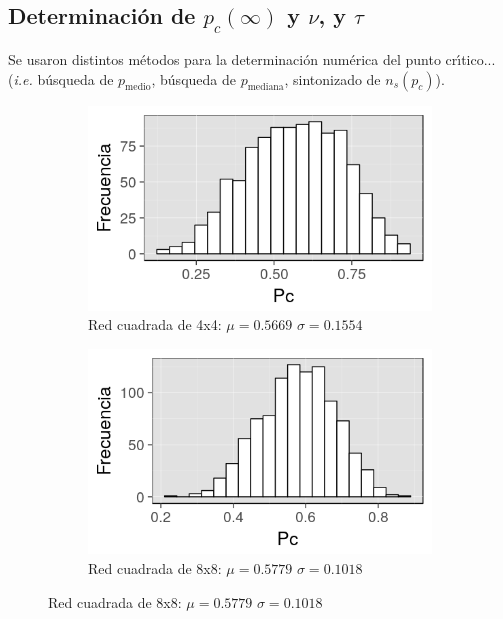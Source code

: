 \documentclass[%
 reprint,
 amsmath,amssymb,
 aps,
spanish]{revtex4-1}
\begin{document}
\subsection{\label{p_c} Determinaci\'on de $p_c(\infty)$ y $\nu$, y $\tau$}

Se usaron distintos m\'etodos para la determinaci\'on num\'erica del punto cr\'\i tico...(\emph{i.e.} b\'usqueda de $p_\mathrm{medio}$, b\'usqueda de $p_\mathrm{mediana}$, sintonizado de $n_s(p_c)$).

\begin{figure}[h]
\begin{subfigure}{.25\textwidth}
  \centering
  \includegraphics[width=.9\linewidth]{ej1a/hist4x4}
  \caption{Red cuadrada de 4x4: $\mu=0.5669$ $\sigma=0.1554$}
  \label{fig:1ahist}
\end{subfigure}%
\begin{subfigure}{.25\textwidth}
  \centering
  \includegraphics[width=.9\linewidth]{ej1a/hist8x8}
  \caption{Red cuadrada de 8x8: $\mu=0.5779$ $\sigma=0.1018$}
  \label{fig:1ahist}
\end{subfigure}

\end{figure}
\end{document}
